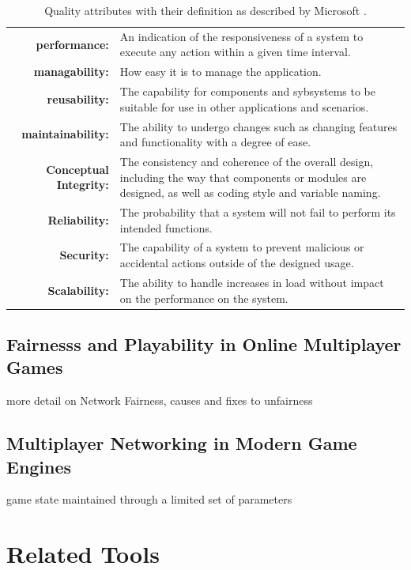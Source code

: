 \documentclass[bsc,frontabs,twoside,singlespacing,parskip,deptreport]{infthesis}     %
\begin{document}
\begin{table}[H]
\centering
  \begin{tabularx}{\textwidth}{r X}
	\textbf{performance:} & An indication of the responsiveness of a system to execute any action within a given time interval.\\
	\textbf{managability:} & How easy it is to manage the application.\\
	\textbf{reusability:} & The capability for components and sybsystems to be suitable for use in other applications and scenarios.\\
	\textbf{maintainability:} & The ability to undergo changes such as changing features and functionality with a degree of ease.\\
	\textbf{Conceptual Integrity:} & The consistency and coherence of the overall design, including the way that components or modules are designed, as well as coding style and variable naming.\\
	\textbf{Reliability:} & The probability that a system will not fail to perform its intended functions. \\
	\textbf{Security:} & The capability of a system to prevent malicious or accidental actions outside of the designed usage. \\
	\textbf{Scalability:} & The ability to handle increases in load without impact on the performance on the system. \\
  \end{tabularx}
  \caption{Quality attributes with their definition as described by Microsoft \cite{quality_attributes}.}
\label{table:quality_attributes}
\end{table}

\section{Fairnesss and Playability in Online Multiplayer Games}

more detail on Network Fairness, causes and fixes to unfairness

\section{Multiplayer Networking in Modern Game Engines}
game state maintained through a limited set of parameters

\chapter{Related Tools}
\end{document}
